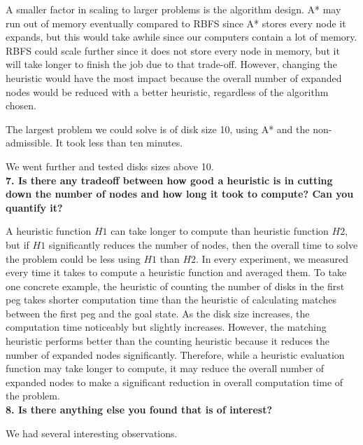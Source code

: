 A smaller factor in scaling to larger problems is the algorithm design. A* may run out of memory eventually compared to RBFS since A* stores every node it expands, but this would take awhile since our computers contain a lot of memory. RBFS could scale further since it does not store every node in memory, but it will take longer to finish the job due to that trade-off. However, changing the heuristic would have the most impact because the overall number of expanded nodes would be reduced with a better heuristic, regardless of the algorithm chosen.

The largest problem we could solve is of disk size 10, using A* and the non-admissible. It took less than ten minutes.  

We went further and tested disks sizes above 10.\\

\textbf{7. Is there any tradeoff between how good a heuristic is in cutting down the number of nodes and how long it took to compute? Can you quantify it?}

A heuristic function $H1$ can take longer to compute than heuristic function $H2$, but if $H1$ significantly reduces the number of nodes, then the overall time to solve the problem could be less using $H1$ than $H2$. In every experiment, we measured every time it takes to compute a heuristic function and averaged them. To take one concrete example, the heuristic of counting the number of disks in the first peg takes shorter computation time than the heuristic of calculating matches between the first peg and the goal state. As the disk size increases, the computation time noticeably but slightly increases. However, the matching heuristic performs better than the counting heuristic because it reduces the number of expanded nodes significantly. Therefore, while a heuristic evaluation function may take longer to compute, it may reduce the overall number of expanded nodes to make a significant reduction in overall computation time of the problem.\\

\textbf{8. Is there anything else you found that is of interest?}

We had several interesting observations.
